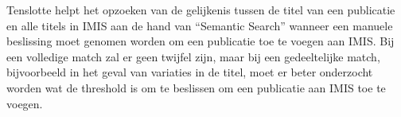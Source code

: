 Tenslotte helpt het opzoeken van de gelijkenis tussen de titel van een publicatie en alle titels in IMIS aan de hand van ``Semantic Search'' wanneer een manuele beslissing moet genomen worden om een publicatie toe te voegen aan IMIS. Bij een volledige match zal er geen twijfel zijn, maar bij een gedeeltelijke match, bijvoorbeeld in het geval van variaties in de titel, moet er beter onderzocht worden wat de threshold is om te beslissen om een publicatie aan IMIS toe te voegen.


